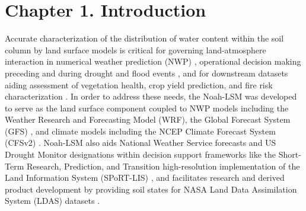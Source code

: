
\chapter{Chapter 1. Introduction}%

Accurate characterization of the distribution of water content within the soil column by land surface models is critical for governing land-atmosphere interaction in numerical weather prediction (NWP) \citep{brocca_spatial-temporal_2010} \citep{koster_contribution_2010}, operational decision making preceding and during drought and flood events \citep{otkin_assessing_2016}, and for downstream datasets aiding assessment of vegetation health, crop yield prediction, and fire risk characterization \citep{case_role_2023}. In order to address these needs, the Noah-LSM was developed to serve as the land surface component coupled to NWP models including the Weather Research and Forecasting Model (WRF), the Global Forecast System (GFS) \citep{jin_sensitivity_2010}\citep{mitchell_ncep_2005}, and climate models including the NCEP Climate Forecast System (CFSv2) \citep{saha_ncep_2014}. Noah-LSM also aids National Weather Service forecasts and US Drought Monitor designations within decision support frameworks like the Short-Term Research, Prediction, and Transition high-resolution implementation of the Land Information System (SPoRT-LIS) \citep{case_nasa_2022}\citep{case_assessment_2014}, and facilitates research and derived product development by providing soil states for NASA Land Data Assimilation System (LDAS) datasets \citep{ek_implementation_2003}.

